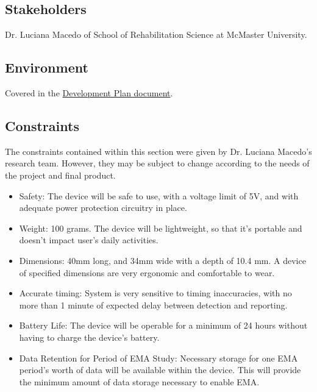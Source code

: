 \documentclass[12pt]{article}
\begin{document}
\subsection{Stakeholders}

Dr. Luciana Macedo of School of Rehabilitation Science at McMaster University.

\subsection{Environment}

Covered in the \href{https://github.com/zakerl/Capstone_Project/blob/main/docs/DevelopmentPlan/DevelopmentPlan.pdf}{Development Plan document}.
\newpage
\subsection{Constraints}
The constraints contained within this section were given by Dr. Luciana Macedo's research team. However, they may be subject to change according to the needs of the project and final product.
\begin{itemize}
    \item Safety: The device will be safe to use, with a voltage limit of 5V, and with adequate power protection circuitry in place.
    \item Weight: 100 grams. The device will be lightweight, so that it's portable and doesn't impact user's daily activities.
    \item Dimensions: 40mm long, and 34mm wide with a depth of 10.4 mm. A device of specified dimensions are very ergonomic and comfortable to wear.
    \item Accurate timing: System is very sensitive to timing inaccuracies, with no more than 1 minute of expected delay between detection and reporting.
    \item Battery Life: The device will be operable for a minimum of 24 hours without having to charge the device's battery.
    \item Data Retention for Period of EMA Study: Necessary storage for one EMA period's worth of data will be available within the device. This will provide the minimum amount of data storage necessary to enable EMA.
\end{itemize}

\pagebreak
\end{document}
